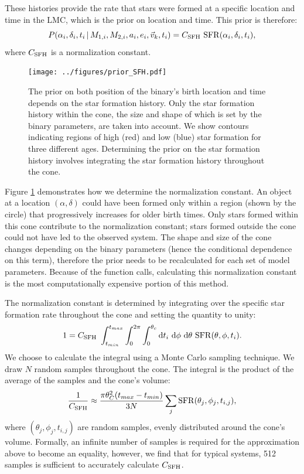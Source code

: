 \documentclass[12pt, preprint]{aastex}
\newcommand{\given}{\,|\,}
\newcommand{\dd}{\mathrm{d}}
\begin{document}
These histories provide the rate that stars were formed at a specific location and time in the LMC, which is the prior on location and time. This prior is therefore:
\begin{equation}
P(\alpha_i, \delta_i, t_i \given M_{1,i}, M_{2,i}, a_i, e_i, \vec{v}_k, t_i) = C_{\rm SFH}\ {\rm SFR}(\alpha_i, \delta_i, t_i),
\end{equation}
where $C_{\rm SFH}$ is a normalization constant. 

\begin{figure}[h!]
\begin{center}
\texttt{[image: ../figures/prior\_SFH.pdf]}
\caption{The prior on both position of the binary's birth location and time depends on the star formation history. Only the star formation history within the cone, the size and shape of which is set by the binary parameters, are taken into account. We show contours indicating regions of high (red) and low (blue) star formation for three different ages. Determining the prior on the star formation history involves integrating the star formation history throughout the cone.}
\label{fig:prior_SFH}
\end{center}
\end{figure}

Figure \ref{fig:prior_SFH} demonstrates how we determine the normalization constant. An object at a location $(\alpha, \delta)$ could have been formed only within a region (shown by the circle) that progressively increases for older birth times. Only stars formed within this cone contribute to the normalization constant; stars formed outside the cone could not have led to the observed system. The shape and size of the cone changes depending on the binary parameters (hence the conditional dependence on this term), therefore the prior needs to be recalculated for each set of model parameters. Because of the function calls, calculating this normalization constant is the most computationally expensive portion of this method. 

The normalization constant is determined by integrating over the specific star formation rate throughout the cone and setting the quantity to unity:
\begin{equation}
1 = C_{\rm SFH}\ \int_{t_{min}}^{t_{max}} \int_0^{2 \pi} \int_0^{\theta_c} \dd t_i\ \dd \phi\ \dd \theta\ {\rm SFR}(\theta, \phi, t_i). 
\end{equation}
We choose to calculate the integral using a Monte Carlo sampling technique. We draw $N$ random samples throughout the cone. The integral is the product of the average of the samples and the cone's volume:
\begin{equation}
\frac{1}{C_{\rm SFH}} \approx \frac{\pi \theta_C^2 (t_{max} - t_{min})}{3N} \sum_j {\rm SFR}(\theta_j, \phi_j, t_{i,j}),
\end{equation}
where $(\theta_j, \phi_j, t_{i,j})$ are random samples, evenly distributed around the cone's volume. Formally, an infinite number of samples is required for the approximation above to become an equality, however, we find that for typical systems, 512 samples is sufficient to accurately calculate $C_{\rm SFH}$.
\end{document}
